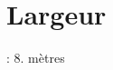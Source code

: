 \hypertarget{_largeur-example}{}\section{Largeur}
\+: 8. mètres


\begin{DoxyCodeInclude}
\end{DoxyCodeInclude}
 